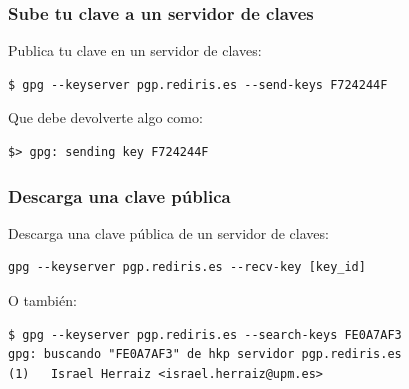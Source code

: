 \documentclass{beamer}
\begin{document}
\begin{frame}[fragile]
\frametitle{Sube tu clave a un servidor de claves}

Publica tu clave en un servidor de claves:



\begin{lstlisting}[frame=trBL]
$ gpg --keyserver pgp.rediris.es --send-keys F724244F
\end{lstlisting}

Que debe devolverte algo como:
\begin{lstlisting}[frame=trBL]
$> gpg: sending key F724244F
\end{lstlisting}

\end{frame}



\begin{frame}[fragile]
\frametitle{Descarga una clave pública}

Descarga una clave pública de un servidor de claves:



\begin{lstlisting}[frame=trBL]
gpg --keyserver pgp.rediris.es --recv-key [key_id]
\end{lstlisting}

\medskip
O también:
\begin{lstlisting}[frame=trBL]
$ gpg --keyserver pgp.rediris.es --search-keys FE0A7AF3
gpg: buscando "FE0A7AF3" de hkp servidor pgp.rediris.es
(1)	  Israel Herraiz <israel.herraiz@upm.es>
\end{lstlisting}

\end{frame}
\end{document}
